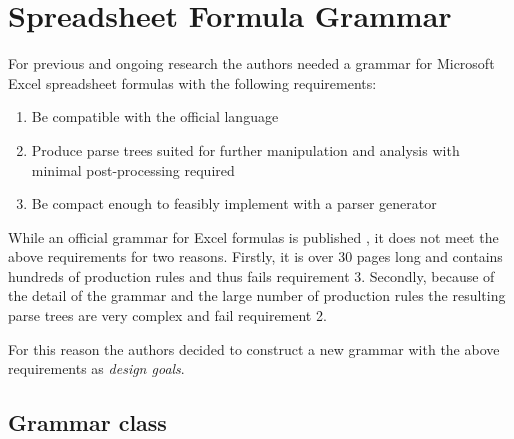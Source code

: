 \documentclass[conference]{IEEEtran}
\begin{document}
\section{Spreadsheet Formula Grammar}
\label{section:grammar}

For previous and ongoing research the authors needed a grammar for Microsoft Excel spreadsheet formulas with the following requirements:

\label{sec:designgoals}
\begin{enumerate}
\item Be compatible with the official language
\item Produce parse trees suited for further manipulation and analysis with minimal post-processing required
\item Be compact enough to feasibly implement with a parser generator
\end{enumerate}

While an official grammar for Excel formulas is published \cite{ExcelOfficialGrammar}, it does not meet the above requirements for two reasons.
Firstly, it is over 30 pages long and contains hundreds of production rules and thus fails requirement 3.
Secondly, because of the detail of the grammar and the large number of production rules the resulting parse trees are very complex and fail requirement 2.

For this reason the authors decided to construct a new grammar with the above requirements as \emph{design goals}.

\subsection{Grammar class}
\end{document}
